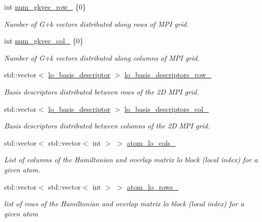 \begin{DoxyCompactItemize}
\item 
int \hyperlink{classsirius_1_1_k__point_a5d6c36943d1096bf7e27e0a81ac834e3}{num\+\_\+gkvec\+\_\+row\+\_\+} \{0\}
\begin{DoxyCompactList}\small\item\em Number of G+k vectors distributed along rows of M\+P\+I grid. \end{DoxyCompactList}\item 
int \hyperlink{classsirius_1_1_k__point_ac3074a84beb6d7df14aff1d8e1402d07}{num\+\_\+gkvec\+\_\+col\+\_\+} \{0\}
\begin{DoxyCompactList}\small\item\em Number of G+k vectors distributed along columns of M\+P\+I grid. \end{DoxyCompactList}\item 
std\+::vector$<$ \hyperlink{structlo__basis__descriptor}{lo\+\_\+basis\+\_\+descriptor} $>$ \hyperlink{classsirius_1_1_k__point_a7dfee55675c203957134694bfedca21a}{lo\+\_\+basis\+\_\+descriptors\+\_\+row\+\_\+}
\begin{DoxyCompactList}\small\item\em Basis descriptors distributed between rows of the 2\+D M\+P\+I grid. \end{DoxyCompactList}\item 
std\+::vector$<$ \hyperlink{structlo__basis__descriptor}{lo\+\_\+basis\+\_\+descriptor} $>$ \hyperlink{classsirius_1_1_k__point_a6483b599581ba095c971ee04c2d61b06}{lo\+\_\+basis\+\_\+descriptors\+\_\+col\+\_\+}
\begin{DoxyCompactList}\small\item\em Basis descriptors distributed between columns of the 2\+D M\+P\+I grid. \end{DoxyCompactList}\item 
std\+::vector$<$ std\+::vector$<$ int $>$ $>$ \hyperlink{classsirius_1_1_k__point_a60c93116b6de3660cd0375f4e268e1ae}{atom\+\_\+lo\+\_\+cols\+\_\+}
\begin{DoxyCompactList}\small\item\em List of columns of the Hamiltonian and overlap matrix lo block (local index) for a given atom. \end{DoxyCompactList}\item 
std\+::vector$<$ std\+::vector$<$ int $>$ $>$ \hyperlink{classsirius_1_1_k__point_adf2c9c65bb23f1ce9a7451d5d4553195}{atom\+\_\+lo\+\_\+rows\+\_\+}
\begin{DoxyCompactList}\small\item\em list of rows of the Hamiltonian and overlap matrix lo block (local index) for a given atom \end{DoxyCompactList}\item 

\end{DoxyCompactItemize}
